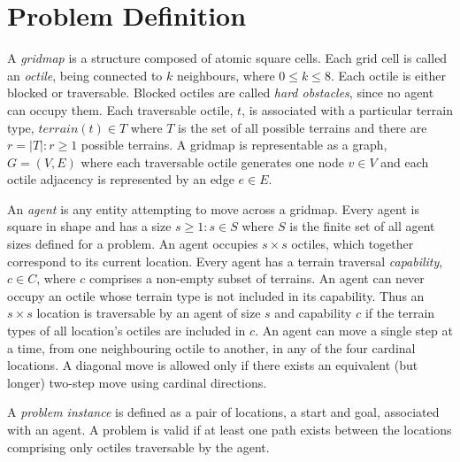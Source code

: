 \section{Problem Definition}
A \emph{gridmap} is a structure composed of atomic square cells.
Each grid cell is called an \emph{octile}, being connected to $k$ neighbours, where  $0 \leq k \leq 8$. 
Each octile is either blocked or traversable. 
Blocked octiles are called \emph{hard obstacles}, since no agent can occupy them.
Each traversable octile, $t$, is associated with a particular terrain type, $terrain(t) \in T$ where $T$ is the set of all possible terrains and there are $r = |T| : r \geq 1$ possible terrains.
A gridmap is representable as a graph, $G = (V, E)$ where each traversable octile generates one node $v \in V$ and each octile adjacency is represented by an edge $e \in E$.
\par \indent
An \emph{agent} is any entity attempting to move across a gridmap. 
Every agent is square in shape and has a size $s \geq 1 : s \in S$ where $S$ is the finite set of all agent sizes defined for a problem.
An agent occupies $s \times s$ octiles, which together correspond to its current location. 
Every agent has a terrain traversal \emph{capability}, $c \in C$, where $c$ comprises a non-empty subset of terrains.
An agent can never occupy an octile whose terrain type is not included in its capability.
Thus an $s \times s$ location is traversable by an agent of size $s$ and capability $c$ if the terrain types of all location's octiles are included in $c$.
%
An agent can move a single step at a time, from one neighbouring octile to another, in any of the four cardinal locations. 
A diagonal move is allowed only if there exists an equivalent (but longer) two-step move using cardinal directions.
%
%
\par \indent
A \emph{problem instance} is defined as a pair of locations, a start and goal, associated with an agent. A problem is valid if at least one path exists between the locations comprising only octiles traversable by the agent. 
